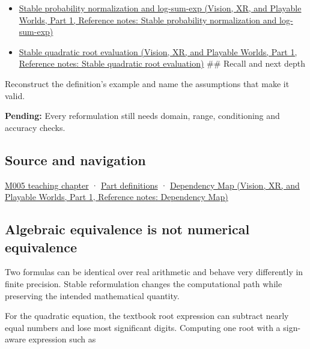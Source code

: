 \begin{itemize}
\tightlist
\item
  \href{../07-Vision-XR-and-Playable-Worlds-P01/main.pdf\#nameddest=appendix-d580b422240f}{Stable probability normalization and log-sum-exp (Vision, XR, and Playable Worlds, Part 1, Reference notes: Stable probability normalization and log-sum-exp)}
\item
  \href{../07-Vision-XR-and-Playable-Worlds-P01/main.pdf\#nameddest=appendix-b9afba7f63e5}{Stable quadratic root evaluation (Vision, XR, and Playable Worlds, Part 1, Reference notes: Stable quadratic root evaluation)} \#\# Recall and next depth
\end{itemize}

Reconstruct the definition's example and name the assumptions that make it valid.

\textbf{Pending:} Every reformulation still needs domain, range, conditioning and accuracy checks.

\subsection{Source and navigation}\label{appendix-d7f8ba961670-source-and-navigation}

\hypertarget{appendix-d7f8ba961670-source-and-navigation}{}

\hyperref[01-foundations-i-ch001-when-arithmetic-meets-uncertainty]{M005 teaching chapter} · \hyperref[appendix-fd090d982a15-m005---parts-77-88]{Part definitions} · \href{../07-Vision-XR-and-Playable-Worlds-P01/main.pdf\#nameddest=appendix-4ad47bdd269a}{Dependency Map (Vision, XR, and Playable Worlds, Part 1, Reference notes: Dependency Map)}

\subsection{Algebraic equivalence is not numerical equivalence}\label{appendix-d7f8ba961670-algebraic-equivalence-is-not-numerical-equivalence}

\hypertarget{appendix-d7f8ba961670-algebraic-equivalence-is-not-numerical-equivalence}{}

Two formulas can be identical over real arithmetic and behave very differently in finite precision. Stable reformulation changes the computational path while preserving the intended mathematical quantity.

For the quadratic equation, the textbook root expression can subtract nearly equal numbers and lose most significant digits. Computing one root with a sign-aware expression such as

